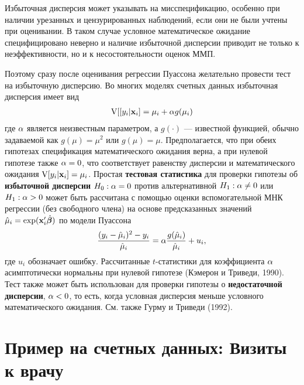 Избыточная дисперсия может указывать на мисспецификацию, особенно при наличии урезанных и цензурированных наблюдений, если они не были учтены при оценивании. В таком случае условное математическое ожидание специфицировано неверно и наличие избыточной дисперсии приводит не только к неэффективности, но и к несостоятельности оценок ММП.

Поэтому сразу после оценивания регрессии Пуассона желательно провести тест на избыточную дисперсию. Во многих моделях счетных данных избыточная дисперсия имеет вид
    \begin{align}\label{eq:20.9}
    \mathrm{V}[[y_i|\mathbf{x}_i] = \mu_i + \alpha g(\mu_i)
    \end{align}
где $\alpha$ является неизвестным параметром, а $g(\cdot)$ --- известной функцией, обычно задаваемой как $g(\mu) = \mu^2$ или $g(\mu) =\mu$. Предполагается, что при обеих гипотезах спецификация математического ожидания верна, а при нулевой гипотезе также $\alpha = 0$, что соответствует равенству дисперсии и математического ожидания $\mathrm{V}[y_i|\mathbf{x}_i] = \mu_i$.
Простая \textbf{тестовая статистика} для проверки гипотезы об \textbf{избыточной дисперсии} $H_0: \alpha = 0$ против альтернативной $H_1: \alpha \ne 0$ или $H_1: \alpha > 0$ может быть рассчитана с помощью оценки вспомогательной МНК регрессии (без свободного члена) на основе предсказанных значений $\hat{\mu}_i = \exp(\mathbf{x}'_i\hat{\bm{\beta}})$ по модели Пуассона
    \begin{align}\label{eq:20.10}
    \frac{(y_i - \hat{\mu}_i)^2 - y_i}{\hat{\mu}_i} = \alpha\frac{g(\hat{\mu}_i)}{\hat{\mu}_i} + u_i,
    \end{align}
где $u_i$ обозначает ошибку. Рассчитанные $t$-статистики для коэффициента $\alpha$ асимптотически нормальны при нулевой гипотезе (Кэмерон и Триведи, 1990). Тест также может быть использован для проверки гипотезы о \textbf{недостаточной дисперсии}, $\alpha < 0$, то есть, когда условная дисперсия меньше условного математического ожидания. См. также Гурму и Триведи (1992).




\section{Пример на счетных данных: Визиты к врачу}\label{sec:20.3}

